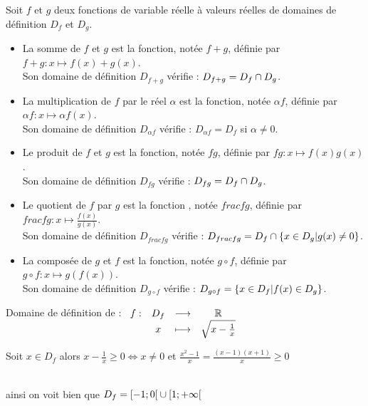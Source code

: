 \begin{defi} 
	Soit \(f\) et \(g\) deux fonctions de variable réelle à valeurs réelles de domaines de définition \(D_f\) et \(D_g\).
	\begin{itemize}
		\item La somme de \(f\) et \(g\) est la fonction, notée \(f + g\), définie par \(f + g : x \mapsto f(x) + g(x)\). \\
		      Son domaine de définition \(D_{f+g}\) vérifie : \(D_{f+g} = D_f \cap D_g\).
		\item  La multiplication de \(f\) par le réel \(\alpha\) est la fonction, notée \(\alpha f\), définie par \(\alpha f : x \mapsto \alpha f(x)\). \\
		      Son domaine de définition \(D_{\alpha f}\) vérifie : \(D_{\alpha f} = D_f\) si \(\alpha \neq 0\).
		\item Le produit de \(f\) et \(g\) est la fonction, notée \(f g\), définie par \(f g : x \mapsto f(x)g(x)\). \\
		      Son domaine de définition \(D_{fg}\) vérifie : \(D_{fg} = D_f \cap D_g\).
		\item Le quotient de \(f\) par \(g\) est la fonction , notée \(frac{f}{g}\), définie par \(frac{f}{g} : x \mapsto \frac{f(x)}{g(x)}\). \\
		      Son domaine de définition \(D_{frac{f}{g}}\) vérifie : \(D_{frac{f}{g}} = D_f \cap \left\lbrace x \in D_g | g(x) \neq 0\right\rbrace\).
		\item La composée de \(g\) et \(f\) est la fonction, notée \(g \circ f\), définie par \(g \circ f : x \mapsto g(f(x))\). \\
		      Son domaine de définition \(D_{g \circ f}\) vérifie : \(D_{g \circ f} = \left\lbrace x \in D_f | f(x) \in D_g\right\rbrace\).
	\end{itemize}
\end{defi}

\begin{exoex}
	Domaine de définition de : \(\begin{array}[t]{cccc}f : & D_f & \longrightarrow & \mathbb{R} \\ & x & \longmapsto & \sqrt{x-\frac{1}{x}}\end{array} \)
\end{exoex}

\begin{corr}
	Soit \(x \in D_f\) alors \(x-\frac{1}{x} \geq 0 \iff x\neq 0\) et \(\frac{x^2-1}{x} = \frac{(x-1)(x+1)}{x} \geq 0\)\\
	\\
	ainsi on voit bien que \(D_f = \left[-1;0\right[\cup\left[1;+\infty\right[\)
\end{corr}

